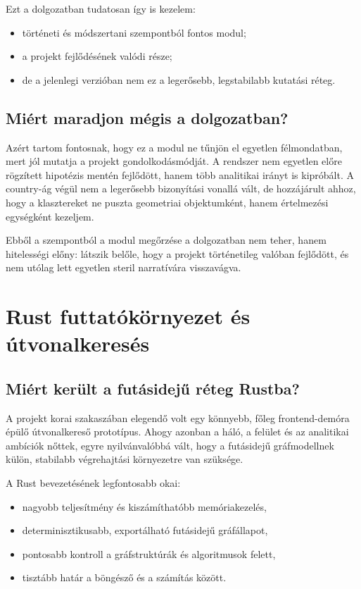 \documentclass[a4paper,12pt]{report}
\begin{document}
Ezt a dolgozatban tudatosan így is kezelem:

\begin{itemize}
    \item történeti és módszertani szempontból fontos modul;
    \item a projekt fejlődésének valódi része;
    \item de a jelenlegi verzióban nem ez a legerősebb, legstabilabb kutatási réteg.
\end{itemize}

\section{Miért maradjon mégis a dolgozatban?}

Azért tartom fontosnak, hogy ez a modul ne tűnjön el egyetlen félmondatban, mert jól mutatja a projekt gondolkodásmódját. A rendszer nem egyetlen előre rögzített hipotézis mentén fejlődött, hanem több analitikai irányt is kipróbált. A country-ág végül nem a legerősebb bizonyítási vonallá vált, de hozzájárult ahhoz, hogy a klasztereket ne puszta geometriai objektumként, hanem értelmezési egységként kezeljem.

Ebből a szempontból a modul megőrzése a dolgozatban nem teher, hanem hitelességi előny: látszik belőle, hogy a projekt történetileg valóban fejlődött, és nem utólag lett egyetlen steril narratívára visszavágva.

\chapter{Rust futtatókörnyezet és útvonalkeresés}

\section{Miért került a futásidejű réteg Rustba?}

A projekt korai szakaszában elegendő volt egy könnyebb, főleg frontend-demóra épülő útvonalkereső prototípus. Ahogy azonban a háló, a felület és az analitikai ambíciók nőttek, egyre nyilvánvalóbbá vált, hogy a futásidejű gráfmodellnek külön, stabilabb végrehajtási környezetre van szüksége.

A Rust bevezetésének legfontosabb okai:

\begin{itemize}
    \item nagyobb teljesítmény és kiszámíthatóbb memóriakezelés,
    \item determinisztikusabb, exportálható futásidejű gráfállapot,
    \item pontosabb kontroll a gráfstruktúrák és algoritmusok felett,
    \item tisztább határ a böngésző és a számítás között.
\end{itemize}
\end{document}

